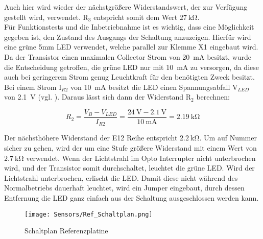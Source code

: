 Auch hier wird wieder der nächstgrößere Widerstandswert, der zur Verfügung gestellt wird, verwendet. R$_{3}$ entspricht somit dem Wert $\qty{27}{\kilo\ohm}$.\\
Für Funktionstests und die Inbetriebnahme ist es wichtig, dass eine Möglichkeit gegeben ist, den Zustand des Ausgangs der Schaltung anzuzeigen. Hierfür wird eine grüne 5mm LED verwendet, welche parallel zur Klemme X1 eingebaut wird. Da der Transistor einen maximalen Collector Strom von \qty{20}{\milli\ampere} besitzt, wurde die Entscheidung getroffen, die grüne LED nur mit \qty{10}{\milli\ampere} zu versorgen, da diese auch bei geringerem Strom genug Leuchtkraft für den benötigten Zweck besitzt. Bei einem Strom I$_{R2}$ von \qty{10}{\milli\ampere} besitzt die LED einen Spannungsabfall V$_{LED}$ von \qty{2.1}{\volt} (vgl. \cite{led_grün}). Daraus lässt sich dann der Widerstand R$_{2}$ berechnen:

\begin{equation*}
    R_{2} = \frac{V_{B} - V_{LED}}{I_{R2}} = \frac{\qty{24}{\volt} - \qty{2.1}{\volt}}{\qty{10}{\milli\ampere}} = \qty{2.19}{\kilo\ohm}
\end{equation*}

Der nächsthöhere Widerstand der E12 Reihe entspricht $\qty{2,2}{\kilo\ohm}$. Um auf Nummer sicher zu gehen, wird der um eine Stufe größere Widerstand mit einem Wert von $\qty{2,7}{\kilo\ohm}$ verwendet. Wenn der Lichtstrahl im Opto Interrupter nicht unterbrochen wird, und der Transistor somit durchschaltet, leuchtet die grüne LED. Wird der Lichtstrahl unterbrochen, erlischt die LED. Damit diese nicht während des Normalbetriebs dauerhaft leuchtet, wird ein Jumper eingebaut, durch dessen Entfernung die LED ganz einfach aus der Schaltung ausgeschlossen werden kann.

\begin{figure}[H]
    \centering
    \texttt{[image: Sensors/Ref\_Schaltplan.png]}
    \caption{Schaltplan Referenzplatine}
    \label{Ref_Schaltplan}
\end{figure}

